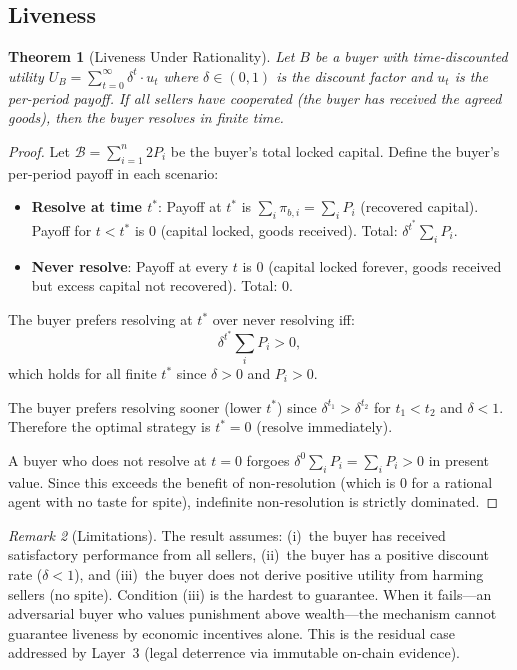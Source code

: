 \documentclass[11pt,a4paper]{article}
\newtheorem{theorem}{Theorem}[section]
\theoremstyle{definition}
\theoremstyle{remark}
\newtheorem{remark}[theorem]{Remark}
\newcommand{\pay}{P}           %
\begin{document}
\subsection{Liveness}

\begin{theorem}[Liveness Under Rationality]
\label{thm:liveness}
Let $B$ be a buyer with time-discounted utility
$U_B = \sum_{t=0}^{\infty} \delta^t \cdot u_t$ where $\delta \in (0, 1)$
is the discount factor and $u_t$ is the per-period payoff. If all
sellers have cooperated (the buyer has received the agreed goods), then
the buyer resolves in finite time.
\end{theorem}

\begin{proof}
Let $\mathcal{B} = \sum_{i=1}^{n} 2\pay_i$ be the buyer's total
locked capital. Define the buyer's per-period payoff in each scenario:
\begin{itemize}
  \item \textbf{Resolve at time $t^*$}: Payoff at $t^*$ is
    $\sum_i \pi_{b,i} = \sum_i \pay_i$ (recovered capital).
    Payoff for $t < t^*$ is $0$ (capital locked, goods received).
    Total: $\delta^{t^*} \sum_i \pay_i$.
  \item \textbf{Never resolve}: Payoff at every $t$ is $0$ (capital
    locked forever, goods received but excess capital not recovered).
    Total: $0$.
\end{itemize}

The buyer prefers resolving at $t^*$ over never resolving iff:
\begin{equation}
  \delta^{t^*} \sum_i \pay_i > 0,
  \label{eq:liveness-condition}
\end{equation}
which holds for all finite $t^*$ since $\delta > 0$ and $\pay_i > 0$.

The buyer prefers resolving sooner (lower $t^*$) since
$\delta^{t_1} > \delta^{t_2}$ for $t_1 < t_2$ and $\delta < 1$.
Therefore the optimal strategy is $t^* = 0$ (resolve immediately).

A buyer who does not resolve at $t = 0$ forgoes
$\delta^0 \sum_i \pay_i = \sum_i \pay_i > 0$ in present value.
Since this exceeds the benefit of non-resolution (which is $0$ for
a rational agent with no taste for spite), indefinite non-resolution
is strictly dominated.
\end{proof}

\begin{remark}[Limitations]
\label{rem:liveness-limitations}
The result assumes: (i)~the buyer has received satisfactory performance
from all sellers, (ii)~the buyer has a positive discount rate
($\delta < 1$), and (iii)~the buyer does not derive positive utility
from harming sellers (no spite). Condition (iii) is the hardest to
guarantee. When it fails---an adversarial buyer who values
punishment above wealth---the mechanism cannot guarantee liveness
by economic incentives alone. This is the residual case addressed by
Layer~3 (legal deterrence via immutable on-chain evidence).
\end{remark}
\end{document}
